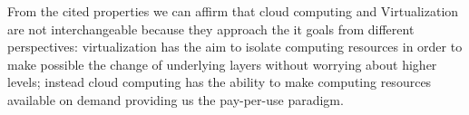 From the cited properties we can affirm that cloud computing and Virtualization are not interchangeable
because they approach the \acs{it} goals from different perspectives: virtualization has the aim to
isolate computing resources in order to make possible the change of underlying layers without worrying
about higher levels; instead cloud computing has the ability to make computing resources available on
demand providing us the pay-per-use paradigm.